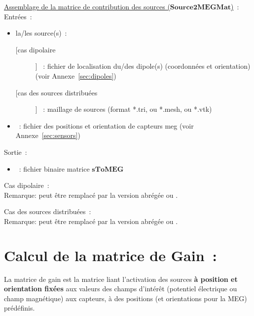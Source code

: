 \bigskip

\noindent
\underline{Assemblage de la matrice de contribution des sources ($\mathbf{Source2MEGMat}$)}~:\\
Entrées~:
\begin{itemize}
    \item la/les source(s)~:
    \begin{description}
        \item [[cas dipolaire]] ~: fichier de localisation du/des dipole(s) (coordonnées et orientation) (voir Annexe~\ref{sec:dipoles}) 
        \item [[cas des sources distribuées]] ~: maillage de sources (format *.tri, ou *.mesh, ou *.vtk)
    \end{description}
    \item {}~: fichier des positions et orientation de capteurs meg (voir Annexe~\ref{sec:sensors})
\end{itemize}
Sortie~: 
\begin{itemize}
    \item {}~: fichier binaire matrice $\mathbf{sToMEG}$
\end{itemize}

\medskip

\noindent
Cas dipolaire~:\\
\noindent
{}
\medskip
Remarque:  peut être remplacé par la version abrégée  ou .

\medskip

\noindent
Cas des sources distribuées~:\\
\noindent
{}
\medskip
Remarque:  peut être remplacé par la version abrégée  ou .

\section{Calcul de la matrice de Gain~:}
\label{sect: command gain}

La matrice de gain est la matrice liant l'activation des sources \textbf{à position et orientation fixées} aux valeurs des champs d'intérêt (potentiel électrique ou champ magnétique) aux capteurs, à des positions (et orientations pour la MEG)  prédéfinis. 

